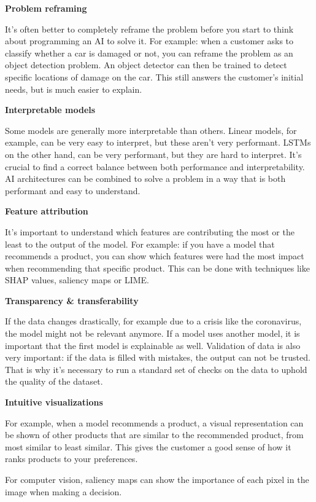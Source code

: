 \documentclass{article}
\begin{document}
\textbf{Problem reframing}

It's often better to completely reframe the problem before you start to think about
programming an AI to solve it. For example: when a customer asks to classify whether
a car is damaged or not, you can reframe the problem as an object detection problem.
An object detector can then be trained to detect specific locations of damage on the car.
This still answers the customer's initial needs, but is much easier to explain.

\textbf{Interpretable models}

Some models are generally more interpretable than others. Linear models, for example,
can be very easy to interpret, but these aren't very performant. LSTMs on the other hand,
can be very performant, but they are hard to interpret. It's crucial to find a correct
balance between both performance and interpretability. AI architectures can be combined
to solve a problem in a way that is both performant and easy to understand.

\textbf{Feature attribution}

It's important to understand which features are contributing the most or the least 
to the output of the model. For example: if you have a model that recommends a product,
you can show which features were had the most impact when recommending that specific product.
This can be done with techniques like SHAP values, saliency maps or LIME.

\textbf{Transparency \& transferability}

If the data changes drastically, for example due to a crisis like the coronavirus, the model might not be relevant anymore.
If a model uses another model, it is important that the first model is explainable as well. 
Validation of data is also very important: if the data is filled with mistakes, 
the output can not be trusted. That is why it's necessary to run a standard set of checks
on the data to uphold the quality of the dataset.

\textbf{Intuitive visualizations}

For example, when a model recommends a product, a visual representation can be shown of 
other products that are similar to the recommended product, from most similar to least similar.
This gives the customer a good sense of how it ranks products to your preferences.

For computer vision, saliency maps can show the importance of each pixel in the image when 
making a decision.
\end{document}
